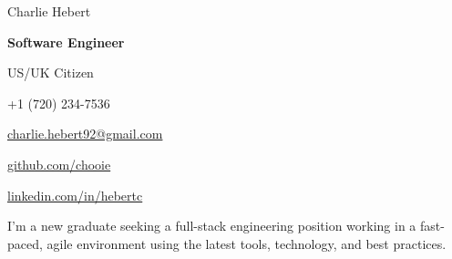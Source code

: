 \begin{center}
  {\Huge Charlie Hebert}
  
  \textbf{Software Engineer}

  US/UK Citizen
\end{center}

\noindent
\begin{minipage}[t]{0.5\textwidth}
  \begin{description}
    \raggedright
    \item[Mobile] +1 (720) 234-7536
    \item[Email] \href{mailto:charlie.hebert92@gmail.com}{charlie.hebert92@gmail.com}
  \end{description}
\end{minipage}
\noindent
\noindent
\begin{minipage}[t]{0.5\textwidth}
  \begin{description}
    \raggedleft
    \item[Github] \href{http://www.github.com/chooie}{github.com/chooie}
    \item[LinkedIn] \href{http://linkedin.com/in/hebertc}{linkedin.com/in/hebertc}
  \end{description}
\end{minipage}
\noindent

\begin{center}
  I'm a new graduate seeking a full-stack engineering position working in a fast-paced, agile environment using the latest tools, technology, and best practices.
\end{center}

